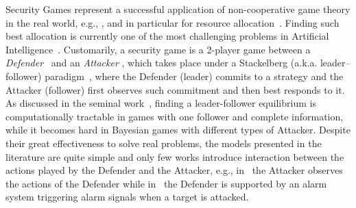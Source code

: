 Security Games represent a successful application of non-cooperative game theory in the real world, e.g., \cite{}, and in particular for resource allocation~\cite{korzhyk2010complexity,tambe2011security}. Finding such best allocation is currently one of the most challenging problems in Artificial Intelligence~\cite{jain2012overview}. Customarily, a security game is a 2-player game between a \emph{Defender} \Def~and an \emph{Attacker} \Att, which takes place under a Stackelberg (a.k.a. leader–follower) paradigm~\cite{von2004leadership}, where the Defender (leader) commits to a strategy and the Attacker (follower) first observes such commitment and then best responds to it. As discussed in the seminal work~\cite{conitzer2006computing}, finding a leader-follower equilibrium is computationally tractable in games with one follower and complete information, while it becomes hard in Bayesian games with different types of Attacker. Despite their great effectiveness to solve real problems, the models presented in the literature are quite simple and only few works introduce interaction between the actions played by the Defender and the Attacker, e.g., in~\cite{papadaki2016patrolling} the Attacker observes
the actions of the Defender while in~\cite{bdg2015advpatr,basilico2016multi,debenignis2016} the Defender is supported by an alarm system triggering alarm signals when a target is attacked.


